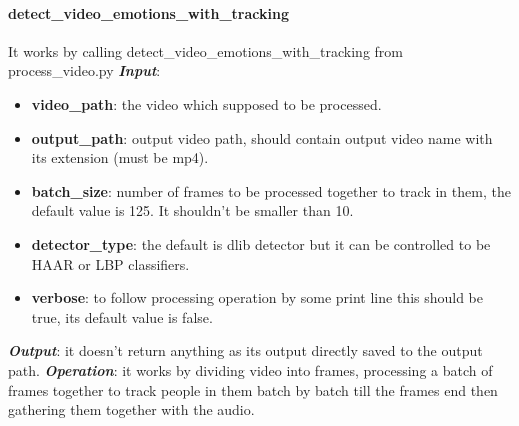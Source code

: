\paragraph{detect\_video\_emotions\_with\_tracking}
It works by calling detect\_video\_emotions\_with\_tracking from process\_video.py
\newline \textbf{\textit{Input}}: 
\begin{itemize}
\item  \textbf{video\_path}: the video which supposed to be processed.
\item  \textbf{output\_path}: output video path, should contain output video name with its extension (must be mp4).
\item  \textbf{batch\_size}: number of frames to be processed together to track in them, the default value is 125. \newline It shouldn't be smaller than 10.
\item \textbf{detector\_type}: the default is dlib detector but it can be controlled to be HAAR or LBP classifiers.
\item  \textbf{verbose}: to follow processing operation by some print line this should be true, its default value is false.
\end{itemize}
\newline \textbf{\textit{Output}}: it doesn't return anything as its output directly saved to the output path.
\newline\textbf{\textit{Operation}}: it works by dividing video into frames, processing a batch of frames together to track people in them batch by batch till the frames end then gathering them together with the audio.
\newline 